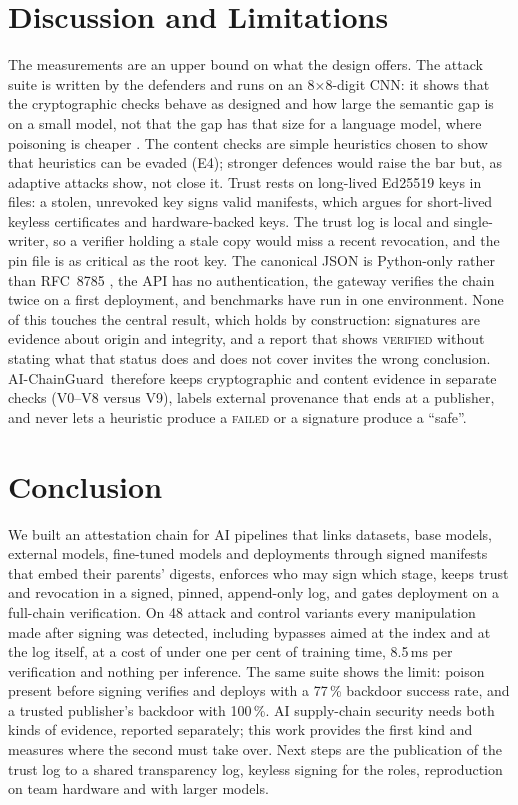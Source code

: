 \documentclass[conference]{IEEEtran}
\newcommand{\sys}{AI-ChainGuard}
\newcommand{\st}[1]{\textsc{#1}}
\begin{document}
\section{Discussion and Limitations}\label{sec:discussion}
The measurements are an upper bound on what the design offers. The attack suite is written by the defenders and runs on an 8$\times$8-digit CNN: it shows that the cryptographic checks behave as designed and how large the semantic gap is on a small model, not that the gap has that size for a language model, where poisoning is cheaper \cite{souly2025}. The content checks are simple heuristics chosen to show that heuristics can be evaded (E4); stronger defences \cite{neuralcleanse,strip,spectral,activation} would raise the bar but, as adaptive attacks show, not close it. Trust rests on long-lived Ed25519 keys in files: a stolen, unrevoked key signs valid manifests, which argues for short-lived keyless certificates \cite{sigstore2022} and hardware-backed keys. The trust log is local and single-writer, so a verifier holding a stale copy would miss a recent revocation, and the pin file is as critical as the root key. The canonical JSON is Python-only rather than RFC~8785 \cite{rfc8785}, the API has no authentication, the gateway verifies the chain twice on a first deployment, and benchmarks have run in one environment. None of this touches the central result, which holds by construction: signatures are evidence about origin and integrity, and a report that shows \st{verified} without stating what that status does and does not cover invites the wrong conclusion. \sys\ therefore keeps cryptographic and content evidence in separate checks (V0--V8 versus V9), labels external provenance that ends at a publisher, and never lets a heuristic produce a \st{failed} or a signature produce a ``safe''.

\section{Conclusion}
We built an attestation chain for AI pipelines that links datasets, base models, external models, fine-tuned models and deployments through signed manifests that embed their parents' digests, enforces who may sign which stage, keeps trust and revocation in a signed, pinned, append-only log, and gates deployment on a full-chain verification. On 48 attack and control variants every manipulation made after signing was detected, including bypasses aimed at the index and at the log itself, at a cost of under one per cent of training time, 8.5\,ms per verification and nothing per inference. The same suite shows the limit: poison present before signing verifies and deploys with a 77\,\% backdoor success rate, and a trusted publisher's backdoor with 100\,\%. AI supply-chain security needs both kinds of evidence, reported separately; this work provides the first kind and measures where the second must take over. Next steps are the publication of the trust log to a shared transparency log, keyless signing for the roles, reproduction on team hardware and with larger models.
\end{document}
